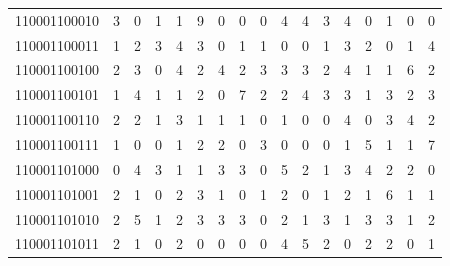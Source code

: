 \documentclass[10pt,a4paper]{article}
\begin{document}
\begin{longtable}{ |c|c|c|c|c|c|c|c|c|c|c|c|c|c|c|c|c| }
    110001100010              & 3                            & 0                                & 1                            & 1                              & 9   & 0   & 0   & 0   & 4   & 4   & 3   & 4   & 0   & 1   & 0   & 0   \\
    110001100011              & 1                            & 2                                & 3                            & 4                              & 3   & 0   & 1   & 1   & 0   & 0   & 1   & 3   & 2   & 0   & 1   & 4   \\
    110001100100              & 2                            & 3                                & 0                            & 4                              & 2   & 4   & 2   & 3   & 3   & 3   & 2   & 4   & 1   & 1   & 6   & 2   \\
    110001100101              & 1                            & 4                                & 1                            & 1                              & 2   & 0   & 7   & 2   & 2   & 4   & 3   & 3   & 1   & 3   & 2   & 3   \\
    110001100110              & 2                            & 2                                & 1                            & 3                              & 1   & 1   & 1   & 0   & 1   & 0   & 0   & 4   & 0   & 3   & 4   & 2   \\
    110001100111              & 1                            & 0                                & 0                            & 1                              & 2   & 2   & 0   & 3   & 0   & 0   & 0   & 1   & 5   & 1   & 1   & 7   \\
    110001101000              & 0                            & 4                                & 3                            & 1                              & 1   & 3   & 3   & 0   & 5   & 2   & 1   & 3   & 4   & 2   & 2   & 0   \\
    110001101001              & 2                            & 1                                & 0                            & 2                              & 3   & 1   & 0   & 1   & 2   & 0   & 1   & 2   & 1   & 6   & 1   & 1   \\
    110001101010              & 2                            & 5                                & 1                            & 2                              & 3   & 3   & 3   & 0   & 2   & 1   & 3   & 1   & 3   & 3   & 1   & 2   \\
    110001101011              & 2                            & 1                                & 0                            & 2                              & 0   & 0   & 0   & 0   & 4   & 5   & 2   & 0   & 2   & 2   & 0   & 1   \\

\end{longtable}
\end{document}
